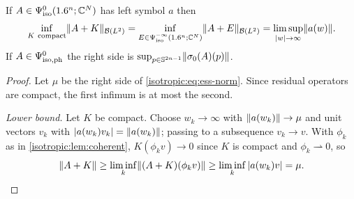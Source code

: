 \begin{theorem}\label{isotropic:thm:ess-norm}
If $A\in\Psi^{0}_{\mathrm{iso}}(1.6^n;\mathbb{C}^N)$ has left symbol $a$ then
\begin{equation}\label{isotropic:eq:ess-norm}
  \inf_{K\ \mathrm{compact}}\lVert A+K\rVert_{\mathcal{B}(L^2)}
  =\inf_{E\in\Psi^{-\infty}_{\mathrm{iso}}(1.6^n;\mathbb{C}^N)}\lVert A+E\rVert_{\mathcal{B}(L^2)}
  =\limsup_{|w|\to\infty}\lVert a(w)\rVert.
\end{equation}
If $A\in\Psi^{0}_{\mathrm{iso,ph}}$ the right side is $\sup_{p\in\mathbb{S}^{2n-1}}\lVert \sigma_0(A)(p)\rVert$.
\end{theorem}
\begin{proof}
Let $\mu$ be the right side of \eqref{isotropic:eq:ess-norm}. Since residual
operators are compact, the first infimum is at most the second.

\emph{Lower bound.} Let $K$ be compact. Choose $w_k\to\infty$ with
$\lVert a(w_k)\rVert\to\mu$ and unit vectors $v_k$ with $|a(w_k)v_k|=\lVert a(w_k)\rVert$;
passing to a subsequence $v_k\to v$. With $\phi_k$ as in
\cref{isotropic:lem:coherent}, $K(\phi_kv)\to0$ since $K$ is compact and
$\phi_k\rightharpoonup0$, so
\begin{equation*}
  \lVert A+K\rVert\ge\liminf_k\lVert (A+K)(\phi_kv)\rVert\ge\liminf_k|a(w_k)v|=\mu .
\end{equation*}


\end{proof}
